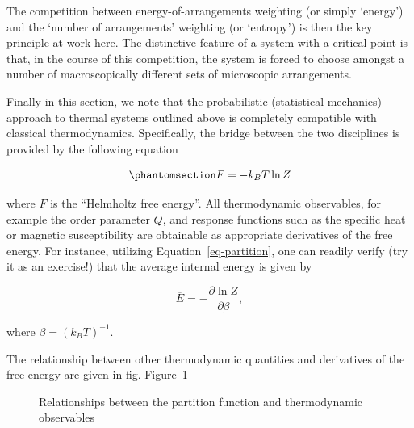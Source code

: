 \documentclass[
  letterpaper,
  DIV=11,
  numbers=noendperiod]{scrreprt}
\begin{document}
The competition between energy-of-arrangements weighting (or simply
`energy') and the `number of arrangements' weighting (or `entropy') is
then the key principle at work here. The distinctive feature of a system
with a critical point is that, in the course of this competition, the
system is forced to choose amongst a number of macroscopically different
sets of microscopic arrangements.

Finally in this section, we note that the probabilistic (statistical
mechanics) approach to thermal systems outlined above is completely
compatible with classical thermodynamics. Specifically, the bridge
between the two disciplines is provided by the following equation

\begin{equation}\phantomsection\label{eq-free}{
F=-k_BT \ln Z
}\end{equation}

where \(F\) is the ``Helmholtz free energy''. All thermodynamic
observables, for example the order parameter \(Q\), and response
functions such as the specific heat or magnetic susceptibility are
obtainable as appropriate derivatives of the free energy. For instance,
utilizing Equation~\ref{eq-partition}, one can readily verify (try it as
an exercise!) that the average internal energy is given by

\[\overline{E}=-\frac{\partial \ln Z}{\partial \beta},\]

where \(\beta=(k_BT)^{-1}\).

The relationship between other thermodynamic quantities and derivatives
of the free energy are given in fig. Figure~\ref{fig-thermo}

\begin{figure}


\caption{\label{fig-thermo}Relationships between the partition function
and thermodynamic observables}

\end{figure}%
\end{document}
